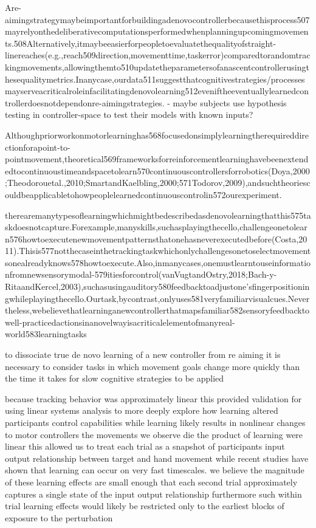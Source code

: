 \documentclass[../main.tex]{subfiles}
\begin{document}
{{Are-aimingstrategymaybeimportantforbuildingadenovocontrollerbecausethisprocess507mayrelyonthedeliberativecomputationsperformedwhenplanningupcomingmovements.508Alternatively,itmaybeeasierforpeopletoevaluatethequalityofstraight-linereaches(e.g.,reach509direction,movementtime,taskerror)comparedtorandomtrackingmovements,allowingthemto510updatetheparametersofanascentcontrollerusingthesequalitymetrics.Inanycase,ourdata511suggestthatcognitivestrategies/processesmayserveacriticalroleinfacilitatingdenovolearning512eveniftheeventuallylearnedcontrollerdoesnotdependonre-aimingstrategies.
	- maybe subjects use hypothesis testing in controller-space to test their models with known inputs?

Althoughpriorworkonmotorlearninghas568focusedonsimplylearningtherequireddirectionforapoint-to-pointmovement,theoretical569frameworksforreinforcementlearninghavebeenextendedtocontinuoustimeandspacetolearn570continuouscontrollersforrobotics(Doya,2000;Theodorouetal.,2010;SmartandKaelbling,2000;571Todorov,2009),andsuchtheoriescouldbeapplicabletohowpeoplelearnedcontinuouscontrolin572ourexperiment.

therearemanytypesoflearningwhichmightbedescribedasdenovolearningthatthis575taskdoesnotcapture.Forexample,manyskills,suchasplayingthecello,challengeonetolearn576howtoexecutenewmovementpatternsthatonehasneverexecutedbefore(Costa,2011).Thisis577notthecaseinthetrackingtaskwhichonlychallengesonetoselectmovementsonealreadyknows578howtoexecute.Also,inmanycases,onemustlearntouseinformationfromnewsensorymodal-579itiesforcontrol(vanVugtandOstry,2018;Bach-y-RitaandKercel,2003),suchasusingauditory580feedbacktoadjustone’sfingerpositioningwhileplayingthecello.Ourtask,bycontrast,onlyuses581veryfamiliarvisualcues.Nevertheless,webelievethatlearninganewcontrollerthatmapsfamiliar582sensoryfeedbacktowell-practicedactionsinanovelwayisacriticalelementofmanyreal-world583learningtasks


to dissociate true de novo learning of a new controller from re aiming it is necessary to consider tasks in which movement goals change more quickly than the time it takes for slow cognitive strategies to be applied

because tracking behavior was approximately linear this provided validation for using linear systems analysis to more deeply explore how learning altered participants control capabilities while learning likely results in nonlinear changes to motor controllers the movements we observe die the product of learning were linear this allowed us to treat each trial as a snapshot of participants input output relationship between target and hand movement while recent studies have shown that learning can occur on very fast timescales. we believe the magnitude of these learning effects are small enough that each second trial approximately captures a single state of the input output relationship furthermore such within trial learning effects would likely be restricted only to the earliest blocks of exposure to the perturbation

}}
\end{document}
